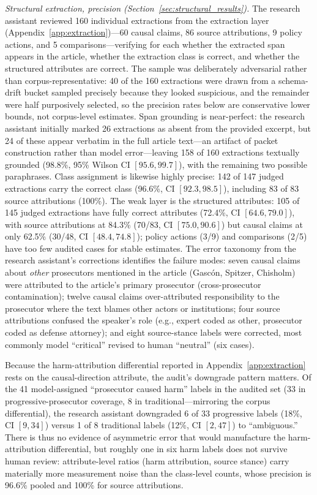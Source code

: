 \documentclass[12pt, letterpaper]{article}
\begin{document}
\emph{Structural extraction, precision (Section~\ref{sec:structural_results}).} The research assistant reviewed 160 individual extractions from the extraction layer (Appendix~\ref{app:extraction})---60 causal claims, 86 source attributions, 9 policy actions, and 5 comparisons---verifying for each whether the extracted span appears in the article, whether the extraction class is correct, and whether the structured attributes are correct. The sample was deliberately adversarial rather than corpus-representative: 40 of the 160 extractions were drawn from a schema-drift bucket sampled precisely because they looked suspicious, and the remainder were half purposively selected, so the precision rates below are conservative lower bounds, not corpus-level estimates. Span grounding is near-perfect: the research assistant initially marked 26 extractions as absent from the provided excerpt, but 24 of these appear verbatim in the full article text---an artifact of packet construction rather than model error---leaving 158 of 160 extractions textually grounded (98.8\%, 95\% Wilson CI $[95.6, 99.7]$), with the remaining two possible paraphrases. Class assignment is likewise highly precise: 142 of 147 judged extractions carry the correct class (96.6\%, CI $[92.3, 98.5]$), including 83 of 83 source attributions (100\%). The weak layer is the structured attributes: 105 of 145 judged extractions have fully correct attributes (72.4\%, CI $[64.6, 79.0]$), with source attributions at 84.3\% (70/83, CI $[75.0, 90.6]$) but causal claims at only 62.5\% (30/48, CI $[48.4, 74.8]$); policy actions (3/9) and comparisons (2/5) have too few audited cases for stable estimates. The error taxonomy from the research assistant's corrections identifies the failure modes: seven causal claims about \emph{other} prosecutors mentioned in the article (Gasc\'{o}n, Spitzer, Chisholm) were attributed to the article's primary prosecutor (cross-prosecutor contamination); twelve causal claims over-attributed responsibility to the prosecutor where the text blames other actors or institutions; four source attributions confused the speaker's role (e.g., expert coded as other, prosecutor coded as defense attorney); and eight source-stance labels were corrected, most commonly model ``critical'' revised to human ``neutral'' (six cases).

Because the harm-attribution differential reported in Appendix~\ref{app:extraction} rests on the causal-direction attribute, the audit's downgrade pattern matters. Of the 41 model-assigned ``prosecutor caused harm'' labels in the audited set (33 in progressive-prosecutor coverage, 8 in traditional---mirroring the corpus differential), the research assistant downgraded 6 of 33 progressive labels (18\%, CI $[9, 34]$) versus 1 of 8 traditional labels (12\%, CI $[2, 47]$) to ``ambiguous.'' There is thus no evidence of asymmetric error that would manufacture the harm-attribution differential, but roughly one in six harm labels does not survive human review: attribute-level ratios (harm attribution, source stance) carry materially more measurement noise than the class-level counts, whose precision is 96.6\% pooled and 100\% for source attributions.
\end{document}
